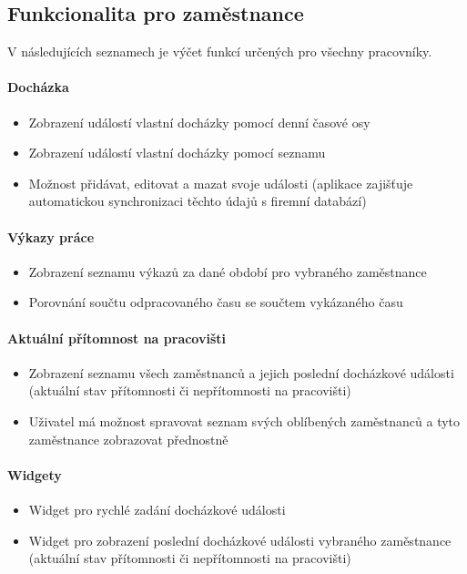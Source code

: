 \documentclass{diplomka}
\begin{document}
\subsection{Funkcionalita pro zaměstnance}
V následujících seznamech je výčet funkcí určených pro všechny pracovníky.
\paragraph{Docházka}
\begin{itemize}[noitemsep,nolistsep]
\item Zobrazení událostí vlastní docházky pomocí denní časové osy
\item Zobrazení událostí vlastní docházky pomocí seznamu
\item Možnost přidávat, editovat a mazat svoje události (aplikace zajišťuje automatickou synchronizaci těchto údajů s firemní databází)
\end{itemize}

\paragraph{Výkazy práce}
\begin{itemize}[noitemsep,nolistsep]
\item Zobrazení seznamu výkazů za dané období pro vybraného zaměstnance
\item Porovnání součtu odpracovaného času se součtem vykázaného času
\end{itemize}

\paragraph{Aktuální přítomnost na pracovišti}
\begin{itemize}[noitemsep,nolistsep]
\item Zobrazení seznamu všech zaměstnanců a jejich poslední docházkové události  (aktuální stav přítomnosti či nepřítomnosti na pracovišti)
\item Uživatel má možnost spravovat seznam svých oblíbených zaměstnanců a tyto zaměstnance zobrazovat přednostně
\end{itemize}

\paragraph{Widgety}
\begin{itemize}[noitemsep,nolistsep]
\item Widget pro rychlé zadání docházkové události
\item Widget pro zobrazení poslední docházkové události vybraného zaměstnance (aktuální stav přítomnosti či nepřítomnosti na pracovišti)
\end{itemize}
\end{document}
